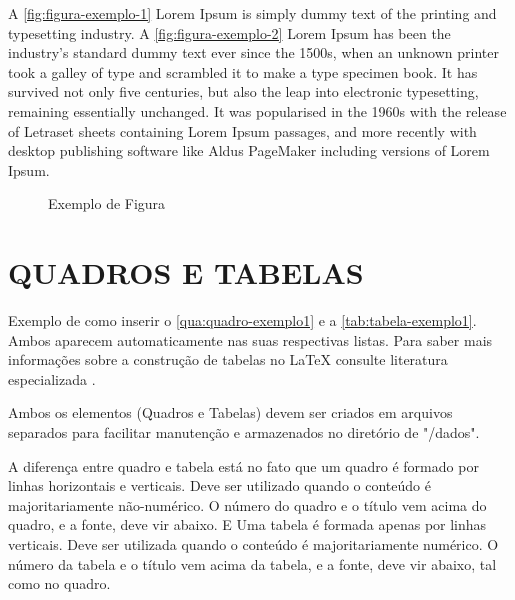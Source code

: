 A \autoref{fig:figura-exemplo-1} Lorem Ipsum is simply dummy text of the printing and typesetting industry.
A \autoref{fig:figura-exemplo-2} Lorem Ipsum has been the industry's standard dummy text ever since the 1500s,
when an unknown printer took a galley of type and scrambled it to make a type
specimen book. It has survived not only five centuries, but also the leap into
electronic typesetting, remaining essentially unchanged. It was popularised in
the 1960s with the release of Letraset sheets containing Lorem Ipsum passages,
and more recently with desktop publishing software like Aldus PageMaker
including versions of Lorem Ipsum.

\begin{figure}[!htb]
    \begin{minipage}{\wd0}
        \caption{Exemplo de Figura}
    \end{minipage}
    \label{fig:figura-exemplo1}
\end{figure}

\chapter{QUADROS E TABELAS}
\label{chap:tabelas}

Exemplo de como inserir o \autoref{qua:quadro-exemplo1} e a \autoref{tab:tabela-exemplo1}. Ambos aparecem automaticamente nas suas respectivas listas. Para saber mais informações sobre a construção de tabelas no \LaTeX{} consulte literatura especializada \cite{Mittelbach2004}.

Ambos os elementos (Quadros e Tabelas) devem ser criados em arquivos separados para facilitar manutenção e armazenados no diretório de "/dados".



A diferença entre quadro e tabela está no fato que um quadro é formado por linhas horizontais e verticais. Deve ser utilizado quando o conteúdo é majoritariamente não-numérico. O número do quadro e o título vem acima do quadro, e a fonte, deve vir abaixo. E Uma tabela é formada apenas por linhas verticais. Deve ser utilizada quando o conteúdo é majoritariamente numérico. O número da tabela e o título vem acima da tabela, e a fonte, deve vir abaixo, tal como no quadro.



